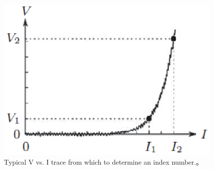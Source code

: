 \begin{figure}[htbp]
	\centering
	\includegraphics[scale=0.7]{chpt7/figs/fig7.23.eps}
	\caption{Typical V vs. I trace from which to determine an index number.。}
\end{figure}


